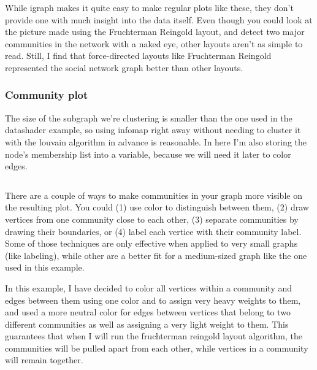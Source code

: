 \documentclass[12pt, a4paper]{article}
\begin{document}
While igraph makes it quite easy to make regular plots like these, they don't provide one with much insight into the data itself. Even though you could look at the picture made using the Fruchterman Reingold layout, and detect two major communities in the network with a naked eye, other layouts aren't as simple to read. Still, I find that force-directed layouts like Fruchterman Reingold represented the social network graph better than other layouts.

\subsubsection{Community plot}

The size of the subgraph we're clustering is smaller than the one used in the datashader example, so using infomap right away without needing to cluster it with the louvain algorithm in advance is reasonable. In here I'm also storing the node's membership list into a variable, because we will need it later to color edges.

\bgroup
  \inputminted[linenos, breaklines=true, fontsize=\scriptsize]{python}{src/youtube/hdg_com/1_clustering.py}
  \label{listing:iplot_1cl}
\egroup


There are a couple of ways to make communities in your graph more visible on the resulting plot. You could (1) use color to distinguish between them, (2) draw vertices from one community close to each other, (3) separate communities by drawing their boundaries, or (4) label each vertice with their community label. Some of those techniques are only effective when applied to very small graphs (like labeling), while other are a better fit for a medium-sized graph like the one used in this example.

In this example, I have decided to color all vertices within a community and edges between them using one color and to assign very heavy weights to them, and used a more neutral color for edges between vertices that belong to two different communities as well as assigning a very light weight to them. This guarantees that when I will run the fruchterman reingold layout algorithm, the communities will be pulled apart from each other, while vertices in a community will remain together.
\end{document}
